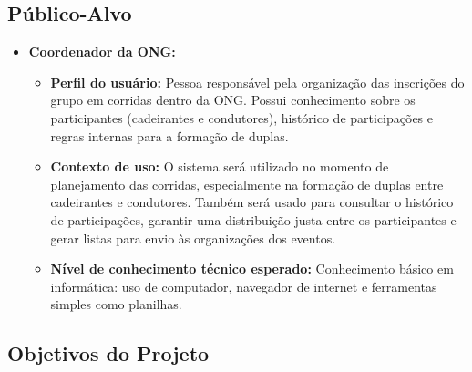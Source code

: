 \documentclass[12pt,a4paper]{article}
\begin{document}
\subsection{Público-Alvo}

\begin{itemize}

    \item \textbf{Coordenador da ONG:}
    \begin{itemize}
        \item \textbf{Perfil do usuário:} Pessoa responsável pela organização das
        inscrições do grupo em corridas dentro da ONG. Possui conhecimento sobre os
        participantes (cadeirantes e condutores), histórico de participações e regras
        internas para a formação de duplas.
        \item \textbf{Contexto de uso:} O sistema será utilizado no momento de
        planejamento das corridas, especialmente na formação de duplas entre cadeirantes
        e condutores. Também será usado para consultar o histórico de participações,
        garantir uma distribuição justa entre os participantes e gerar listas para envio
        às organizações dos eventos.
        \item \textbf{Nível de conhecimento técnico esperado:} Conhecimento básico em
        informática: uso de computador, navegador de internet e ferramentas simples como
        planilhas.
    \end{itemize}

\end{itemize}

\subsection{Objetivos do Projeto}
\end{document}
